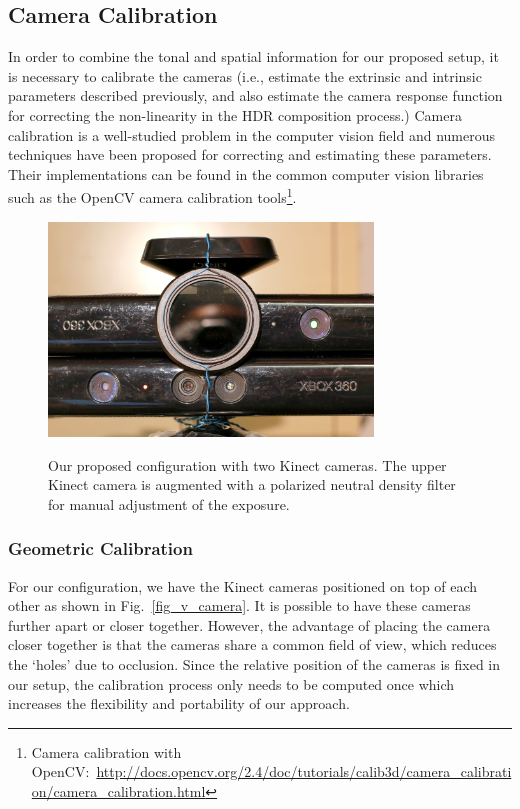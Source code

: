 \subsection{Camera Calibration}
In order to combine the tonal and spatial information for our proposed setup, it is necessary to calibrate the cameras (i.e., estimate the extrinsic and intrinsic parameters described previously, and also estimate the camera response function for correcting the non-linearity in the HDR composition process.) Camera calibration is a well-studied problem in the computer vision field and numerous techniques have been proposed \cite{zhang2000flexible, mann1993compositing, robertson2003estimation} for correcting and estimating these parameters. Their implementations can be found in the common computer vision libraries such as the OpenCV camera calibration tools\footnote{Camera calibration with OpenCV:~\url{http://docs.opencv.org/2.4/doc/tutorials/calib3d/camera_calibration/camera_calibration.html}}.
\begin{figure}
\centering
\includegraphics[width=3.4in]{ch4/diagrams/kinect_closeup} \\
\caption{Our proposed configuration with two Kinect cameras. The upper Kinect camera is augmented with a polarized neutral density filter for manual adjustment of the exposure.}
\label{fig_multiple_camera}
\end{figure}



\subsubsection{Geometric Calibration}
For our configuration, we have the Kinect cameras positioned on top of each other as shown in Fig.~\ref{fig_v_camera}. It is possible to have these cameras further apart or closer together. However, the advantage of placing the camera closer together is that the cameras share a common field of view, which reduces the `holes' due to occlusion. Since the relative position of the cameras is fixed in our setup, the calibration process only needs to be computed once which increases the flexibility and portability of our approach.

